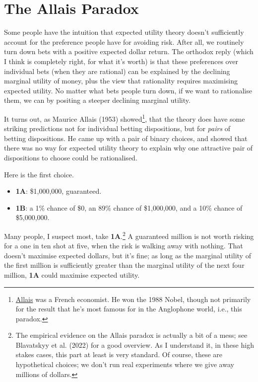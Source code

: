 \documentclass[
  11pt,
  letterpaper,
]{scrbook}
\providecommand{\tightlist}{%
  \setlength{\itemsep}{0pt}\setlength{\parskip}{0pt}}
\begin{document}
\section{The Allais Paradox}\label{sec-allais}

Some people have the intuition that expected utility theory doesn't
sufficiently account for the preference people have for avoiding risk.
After all, we routinely turn down bets with a positive expected dollar
return. The orthodox reply (which I think is completely right, for what
it's worth) is that these preferences over individual bets (when they
are rational) can be explained by the declining marginal utility of
money, plus the view that rationality requires maximising expected
utility. No matter what bets people turn down, if we want to rationalise
them, we can by positing a steeper declining marginal utility.

It turns out, as Maurice Allais (1953) showed\footnote{\href{https://en.wikipedia.org/wiki/Maurice_Allais}{Allais}
  was a French economist. He won the 1988 Nobel, though not primarily
  for the result that he's most famous for in the Anglophone world,
  i.e., this paradox.}, that the theory does have some striking
predictions not for individual betting dispositions, but for
\emph{pairs} of betting dispositions. He came up with a pair of binary
choices, and showed that there was no way for expected utility theory to
explain why one attractive pair of dispositions to choose could be
rationalised.

Here is the first choice.

\begin{itemize}
\tightlist
\item
  \textbf{1A}: \$1,000,000, guaranteed.
\item
  \textbf{1B}: a 1\% chance of \$0, an 89\% chance of \$1,000,000, and a
  10\% chance of \$5,000,000.
\end{itemize}

Many people, I suspect most, take \textbf{1A}.\footnote{The empirical
  evidence on the Allais paradox is actually a bit of a mess; see
  Blavatskyy et al. (2022) for a good overview. As I understand it, in
  these high stakes cases, this part at least is very standard. Of
  course, these are hypothetical choices; we don't run real experiments
  where we give away millions of dollars.} A guaranteed million is not
worth risking for a one in ten shot at five, when the risk is walking
away with nothing. That doesn't maximise expected dollars, but it's
fine; as long as the marginal utility of the first million is
sufficiently greater than the marginal utility of the next four million,
\textbf{1A} could maximise expected utility.
\end{document}
